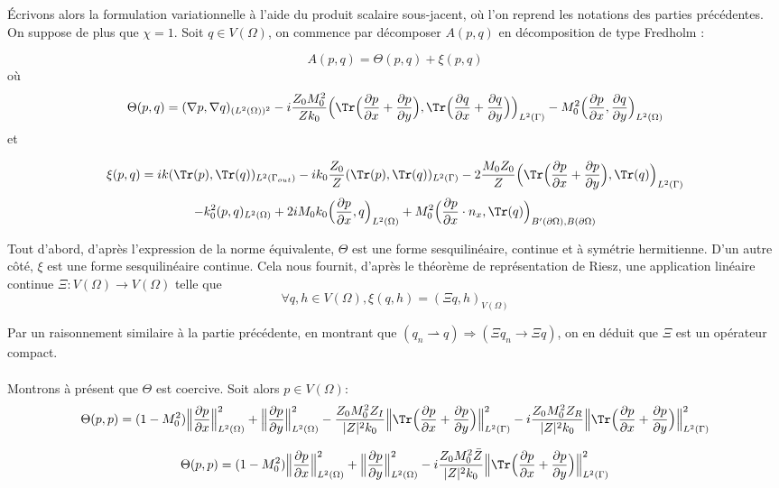 Écrivons alors la formulation variationnelle à l'aide du produit scalaire sous-jacent, où l'on reprend les notations des parties précédentes. On suppose de plus que $\chi = 1$. Soit $q\in V(\Omega)$, on commence par décomposer $A(p,q)$ en décomposition de type Fredholm :

\[A(p,q) = \Theta(p,q) + \xi(p,q)\]
où
\[\Theta(p,q) = (\nabla p, \nabla q)_{(L^2(\Omega))^2} -i\frac{Z_0M_0^2}{Zk_0}\Big( \Tr \Bigl( \frac{\partial p}{\partial x}+\frac{\partial p}{\partial y}\Bigr),\Tr\Bigl( \frac{\partial q}{\partial x}+\frac{\partial q}{\partial y}\Bigr)\Big)_{L^2(\Gamma)} -M_0^2\Big(\frac{\partial p}{\partial x},\frac{\partial q}{\partial y}\Big)_{L^2(\Omega)}\]
et

\[\xi(p,q) = ik(\Tr(p),\Tr(q))_{L^2(\Gamma_{out})} -ik_0\frac{Z_0}{Z} (\Tr(p), \Tr(q))_{L^2(\Gamma)} - 2\frac{M_0Z_0}{Z} \Big(\Tr \Bigl( \frac{\partial p}{\partial x}+\frac{\partial p}{\partial y} \Bigr), \Tr(q)\Big)_{L^2(\Gamma)}  \]
\[-k_0^2(p,q)_{L^2(\Omega)} + 2iM_0k_0\Big(\frac{\partial p}{\partial x}, q\Big)_{L^2(\Omega)}+ M_0^2\Big(\frac{\partial p}{\partial x}\cdot n_x,\Tr(q)\Big)_{B'(\partial \Omega),B(\partial \Omega)}\]

Tout d'abord, d'après l'expression de la norme équivalente, $\Theta$ est une forme sesquilinéaire, continue et à symétrie hermitienne. D'un autre côté, $\xi$ est une forme sesquilinéaire continue. Cela nous fournit, d'après le théorème de représentation de Riesz, une application linéaire continue $\displaystyle \Xi:V(\Omega)\to V(\Omega)$ telle que \[\forall q,h\in V(\Omega), \xi(q,h) = (\Xi q, h)_{V(\Omega)}\]

Par un raisonnement similaire à la partie précédente, en montrant que $(q_n\rightharpoonup q) \Longrightarrow (\Xi q_n \longrightarrow \Xi q)$, on en déduit que $\Xi$ est un opérateur compact. \\ \\
Montrons à présent que $\Theta$ est coercive. Soit alors $p\in V(\Omega)$: \\
\[\Theta(p,p) = (1-M_0^2)\Big\|\frac{\partial p}{\partial x}\Big\|^2_{L^2(\Omega)} + \Big\|\frac{\partial p}{\partial y}\Big\|^2_{L^2(\Omega)}-\frac{Z_0M_0^2Z_I}{|Z|^2k_0}\Big\| \Tr \Bigl( \frac{\partial p}{\partial x}+\frac{\partial p}{\partial y}\Bigr)\Big\|^2_{L^2(\Gamma)}-i\frac{Z_0M_0^2Z_R}{|Z|^2k_0}\Big\| \Tr \Bigl( \frac{\partial p}{\partial x}+\frac{\partial p}{\partial y}\Bigr)\Big\|^2_{L^2(\Gamma)}\]

\[\Theta(p,p) = (1-M_0^2)\Big\|\frac{\partial p}{\partial x}\Big\|^2_{L^2(\Omega)} + \Big\|\frac{\partial p}{\partial y}\Big\|^2_{L^2(\Omega)}-i\frac{Z_0M_0^2\Bar{Z}}{|Z|^2k_0}\Big\| \Tr \Bigl( \frac{\partial p}{\partial x}+\frac{\partial p}{\partial y}\Bigr)\Big\|^2_{L^2(\Gamma)}\]

